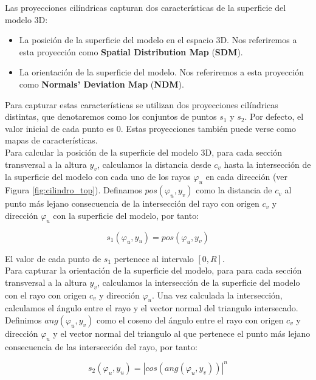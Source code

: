 Las proyecciones cilíndricas capturan dos características de la superficie del modelo 3D:
\begin{itemize}
    \item La posición de la superficie del modelo en el espacio 3D. Nos referiremos a esta proyección como \textbf{Spatial Distribution Map} (\textbf{SDM}).
    \item La orientación de la superficie del modelo. Nos referiremos a esta proyección como \textbf{Normals’ Deviation Map} (\textbf{NDM}).
\end{itemize}

Para capturar estas características se utilizan dos proyecciones cilíndricas distintas, que denotaremos como los conjuntos de puntos $s_1$ y $s_2$. Por defecto, el valor inicial de cada punto es 0. Estas proyecciones también puede verse como mapas de características.\\

Para calcular la posición de la superficie del modelo 3D, para cada sección transversal a la altura $y_v$, calculamos la distancia desde $c_v$ hasta la intersección de la superficie del modelo con cada uno de los rayos $\varphi_u$ en cada dirección (ver Figura \ref{fig:cilindro_top}). Definamos $pos(\varphi_u,y_v)$ como la distancia de $c_v$ al punto más lejano consecuencia de la intersección del rayo con origen $c_v$ y dirección $\varphi_u$ con la superficie del modelo, por tanto:

\begin{equation}
    s_1(\varphi_u,y_u) = pos(\varphi_u,y_v)
\end{equation}

El valor de cada punto de $s_1$ pertenece al intervalo $[0,R]$.\\

Para capturar la orientación de la superficie del modelo, para para cada sección transversal a la altura $y_v$, calculamos la intersección de la superficie del modelo con el rayo con origen $c_v$ y dirección $\varphi_u$. Una vez calculada la intersección, calculamos el ángulo entre el rayo y el vector normal del triangulo intersecado. Definimos $ang(\varphi_u,y_v)$ como el coseno del ángulo entre el rayo con origen $c_v$ y dirección $\varphi_u$ y el vector normal del triangulo al que pertenece el punto más lejano consecuencia de las intersección del rayo, por tanto:

\begin{equation}
    s_2(\varphi_u,y_u) = |cos(ang(\varphi_u,y_v))|^{n}
\end{equation}


